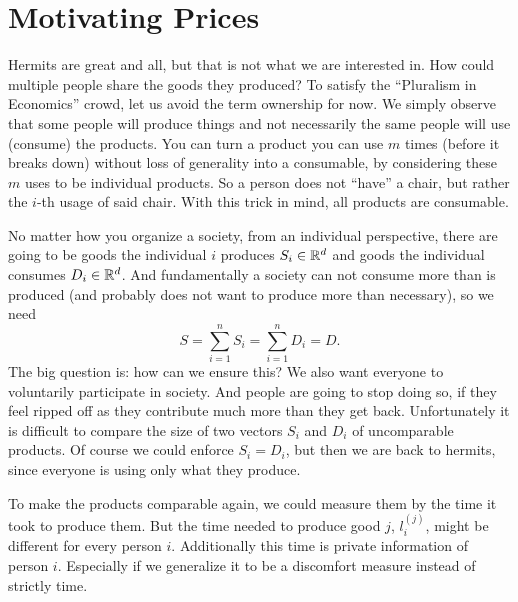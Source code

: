 \section{Motivating Prices}

Hermits are great and all, but that is not what we are interested in. How could
multiple people share the goods they produced? To satisfy the ``Pluralism in
Economics'' crowd, let us avoid the term ownership for now. We simply observe
that some people will produce things and not necessarily the same people will
use (consume) the products. You can turn a product you can use \(m\) times
(before it breaks down) without loss of generality into a consumable, by
considering these \(m\) uses to be individual products. So a person does not
``have'' a chair, but rather the \(i\)-th usage of said chair. With this trick
in mind, all products are consumable.

No matter how you organize a society, from an individual perspective, there
are going to be goods the individual \(i\) produces \(S_i\in\mathbb{R}^d\) and
goods the individual consumes \(D_i\in\mathbb{R}^d\). And fundamentally a
society can not consume more than is produced (and probably does not want to
produce more than necessary), so we need
\[
	S = \sum_{i=1}^n S_i = \sum_{i=1}^n D_i = D.
\]
The big question is: how can we ensure this? We also want everyone to
voluntarily participate in society. And people are going to stop doing so, if
they feel ripped off as they contribute much more than they get back.
Unfortunately it is difficult to compare the size of two vectors \(S_i\) and
\(D_i\) of uncomparable products. Of course we could enforce \(S_i=D_i\), but
then we are back to hermits, since everyone is using only what they produce.

To make the products comparable again, we could measure them by the time it took
to produce them. But the time needed to produce good \(j\), \(l_i^{(j)}\), might
be different for every person \(i\). Additionally this time is private
information of person \(i\). Especially if we generalize it to be a discomfort
measure instead of strictly time.


